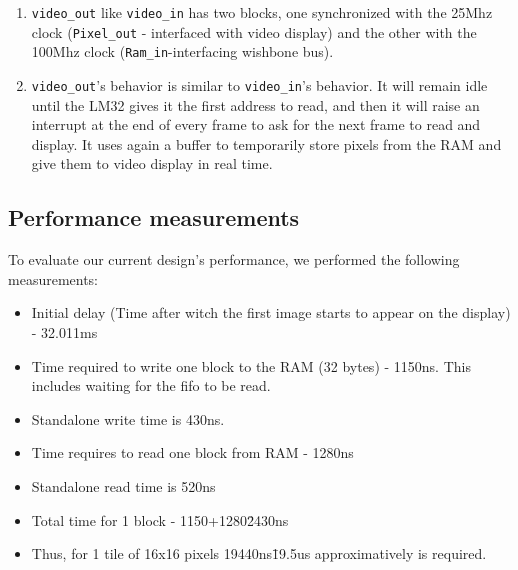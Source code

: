 \begin{enumerate}
\item \texttt{video\_out} like \texttt{video\_in} has two blocks, one synchronized with the 25Mhz clock (\texttt{Pixel\_out} - interfaced with video display) and the other with the 100Mhz clock (\texttt{Ram\_in}-interfacing wishbone bus).

\item \texttt{video\_out}'s behavior is similar to \texttt{video\_in}'s behavior. It will remain idle until the LM32 gives it the first address to read, and then it will raise an interrupt at the end of every frame to ask for the next frame to read and display. It uses again a buffer to temporarily store pixels from the RAM and give them to video display in real time. 

\end{enumerate}

\subsection{Performance measurements}

To evaluate our current design's performance, we performed the following measurements:
\begin{itemize}
\item Initial delay (Time after witch the first image starts to appear on the display) - 32.011ms
\item Time required to write one block to the RAM (32 bytes) - 1150ns.
This includes waiting for the fifo to be read.

\item Standalone write time is 430ns.

\item Time requires to read one block from RAM - 1280ns
\item Standalone read time is 520ns

\item Total time for 1 block - 1150+1280\=2430ns

\item Thus, for 1 tile of 16x16 pixels 19440ns\=19.5us approximatively is required.


\end{itemize}
